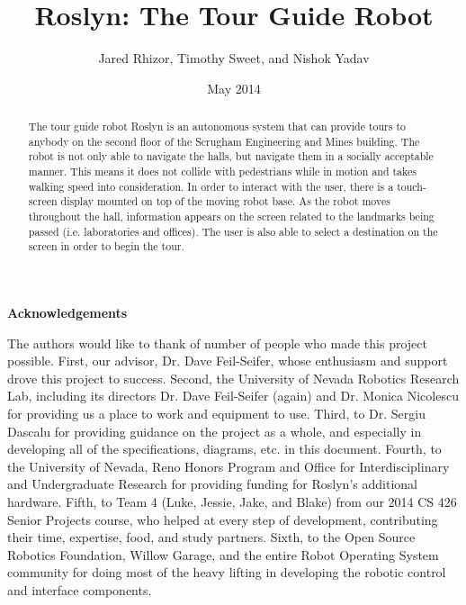 \documentclass[11pt]{report}
\title{Roslyn: The Tour Guide Robot}
\author{Jared Rhizor, Timothy Sweet, and Nishok Yadav}
\date{May 2014}
\begin{document}



\begin{preface}

\begin{abstract}

The tour guide robot Roslyn is an autonomous system that can provide tours to anybody on the second floor of the Scrugham Engineering and Mines building. The robot is not only able to navigate the halls, but navigate them in a socially acceptable manner. This means it does not collide with pedestrians while in motion and takes walking speed into consideration. In order to interact with the user, there is a touch-screen display mounted on top of the moving robot base. As the robot moves throughout the hall, information appears on the screen related to the landmarks being passed (i.e. laboratories and offices). The user is also able to select a destination on the screen in order to begin the tour.

\end{abstract}

\pagebreak   %

\mbox{}



\vspace{0.5in}

\begin{center}

{\Large \bf Acknowledgements}

\end{center}

The authors would like to thank of number of people who made this project possible. First, our advisor, Dr. Dave Feil-Seifer, whose enthusiasm and support drove this project to success. Second, the University of Nevada Robotics Research Lab, including its directors Dr. Dave Feil-Seifer (again) and Dr. Monica Nicolescu for providing us a place to work and equipment to use. Third, to Dr. Sergiu Dascalu for providing guidance on the project as a whole, and especially in developing all of the specifications, diagrams, etc. in this document. Fourth, to the University of Nevada, Reno Honors Program and Office for Interdisciplinary and Undergraduate Research for providing funding for Roslyn's additional hardware. Fifth, to Team 4 (Luke, Jessie, Jake, and Blake) from our 2014 CS 426 Senior Projects course, who helped at every step of development, contributing their time, expertise, food, and study partners. Sixth, to the Open Source Robotics Foundation, Willow Garage, and the entire Robot Operating System community for doing most of the heavy lifting in developing the robotic control and interface components.


\end{preface}
\end{document}
